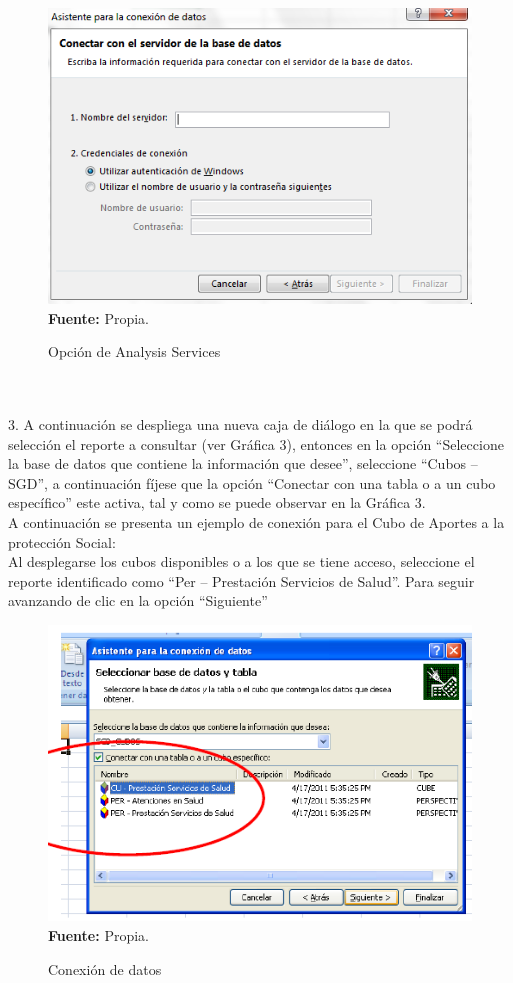 \documentclass[a4paper,openright,12pt]{book}
\theoremstyle{definition}
\theoremstyle{remark}
\begin{document}
\begin{figure}[h]
\centering
\caption{Opción de Analysis Services} 
\includegraphics[scale=0.7]{Rips2}
\label{fig:Rips2}
\\ \textbf{Fuente:} Propia.
\end{figure}\\\\
3. A continuación se despliega una nueva caja de diálogo en la que se podrá selección el reporte a consultar (ver Gráfica 3), entonces en la opción “Seleccione la base de datos que contiene la información que desee”, seleccione “Cubos –SGD”, a continuación fíjese que la opción “Conectar con una tabla o a un cubo específico” este activa, tal y como se puede observar en la Gráfica 3.\\
A continuación se presenta un ejemplo de conexión para el Cubo de Aportes a la protección Social:\\
Al desplegarse los cubos disponibles o a los que se tiene acceso, seleccione el reporte identificado como “Per – Prestación Servicios de Salud”. Para seguir avanzando de clic en la opción “Siguiente”\\

\begin{figure}[h]
\centering
\caption{Conexión de datos} 
\includegraphics[scale=0.7]{Rips3}
\label{fig:Rips3}
\\ \textbf{Fuente:} Propia.
\end{figure}
\end{document}
